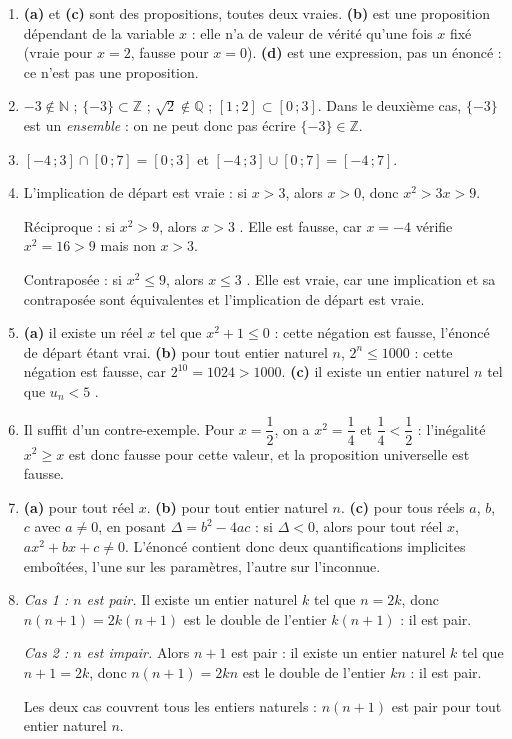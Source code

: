 \begin{enumerate}
  \item \textbf{(a)} et \textbf{(c)} sont des propositions, toutes deux vraies. \textbf{(b)} est
        une proposition dépendant de la variable $x$ : elle n'a de valeur de vérité qu'une fois
        $x$ fixé (vraie pour $x=2$, fausse pour $x=0$). \textbf{(d)} est une expression, pas un
        énoncé : ce n'est pas une proposition.
  \item $-3 \notin \mathbb{N}$ ; \quad $\{-3\} \subset \mathbb{Z}$ ; \quad
        $\sqrt{2} \notin \mathbb{Q}$ ; \quad $[1\,;2] \subset [0\,;3]$. Dans le deuxième cas,
        $\{-3\}$ est un \emph{ensemble} : on ne peut donc pas écrire $\{-3\} \in \mathbb{Z}$.
  \item $[-4\,;3] \cap [0\,;7] = [0\,;3]$ et $[-4\,;3] \cup [0\,;7] = [-4\,;7]$.
  \item L'implication de départ est vraie : si $x>3$, alors $x>0$, donc $x^2>3x>9$.

        Réciproque : \og si $x^2>9$, alors $x>3$ \fg{}. Elle est fausse, car $x=-4$ vérifie
        $x^2=16>9$ mais non $x>3$.

        Contraposée : \og si $x^2 \leq 9$, alors $x \leq 3$ \fg{}. Elle est vraie, car une
        implication et sa contraposée sont équivalentes et l'implication de départ est vraie.
  \item \textbf{(a)} \og il existe un réel $x$ tel que $x^2+1 \leq 0$ \fg{} : cette négation est
        fausse, l'énoncé de départ étant vrai. \textbf{(b)} \og pour tout entier naturel $n$,
        $2^n \leq 1000$ \fg{} : cette négation est fausse, car $2^{10} = 1024 > 1000$.
        \textbf{(c)} \og il existe un entier naturel $n$ tel que $u_n<5$ \fg{}.
  \item Il suffit d'un contre-exemple. Pour $x=\dfrac{1}{2}$, on a $x^2 = \dfrac{1}{4}$ et
        $\dfrac{1}{4} < \dfrac{1}{2}$ : l'inégalité $x^2 \geq x$ est donc fausse pour cette
        valeur, et la proposition universelle est fausse.
  \item \textbf{(a)} pour tout réel $x$. \textbf{(b)} pour tout entier naturel $n$.
        \textbf{(c)} pour tous réels $a$, $b$, $c$ avec $a \neq 0$, en posant
        $\Delta = b^2-4ac$ : si $\Delta<0$, alors pour tout réel $x$, $ax^2+bx+c \neq 0$.
        L'énoncé contient donc deux quantifications implicites emboîtées, l'une sur les
        paramètres, l'autre sur l'inconnue.
  \item \emph{Cas 1 : $n$ est pair.} Il existe un entier naturel $k$ tel que $n=2k$, donc
        $n(n+1) = 2k(n+1)$ est le double de l'entier $k(n+1)$ : il est pair.

        \emph{Cas 2 : $n$ est impair.} Alors $n+1$ est pair : il existe un entier naturel $k$
        tel que $n+1=2k$, donc $n(n+1) = 2kn$ est le double de l'entier $kn$ : il est pair.

        Les deux cas couvrent tous les entiers naturels : $n(n+1)$ est pair pour tout entier
        naturel $n$.
\end{enumerate}

\newpage
\fi
